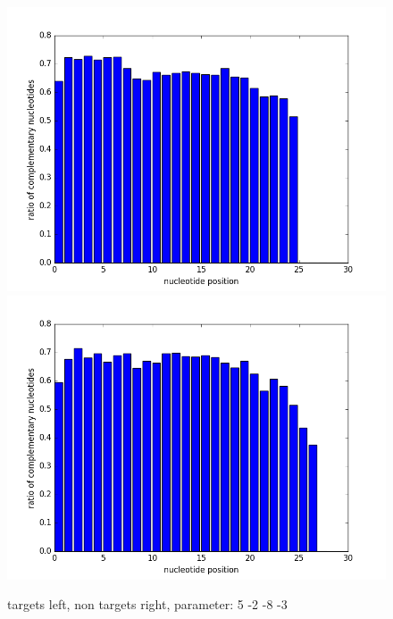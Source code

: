 \documentclass[12pt]{article}
\begin{document}
\begin{figure}
\includegraphics[scale=0.2]{results/ratio5-2-8-3.png}
\includegraphics[scale=0.2]{results/non-ratio5-2-8-3.png}
\caption {targets left, non targets right, parameter: 5 -2 -8 -3}
\label{fig:plot7}
\end{figure} 
\end{document}
